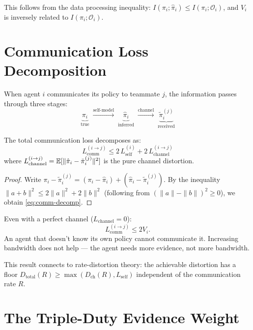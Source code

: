 This follows from the data processing inequality: $I(\pi_i; \hat{\pi}_i) \leq I(\pi_i; \mathcal{O}_i)$, and $V_i$ is inversely related to $I(\pi_i; \mathcal{O}_i)$.


\section{Communication Loss Decomposition}

When agent $i$ communicates its policy to teammate $j$, the information passes through three stages:
\[
    \underbrace{\pi_i}_{\text{true}} \;\xrightarrow{\text{self-model}}\;
    \underbrace{\hat{\pi}_i}_{\text{inferred}} \;\xrightarrow{\text{channel}}\;
    \underbrace{\tilde{\pi}_i^{(j)}}_{\text{received}}
\]

\begin{theorem}\label{thm:comm-decomp}
The total communication loss decomposes as:
\begin{equation}\label{eq:comm-decomp}
    L_{\text{comm}}^{(i \to j)} \leq 2\,L_{\text{self}}^{(i)} + 2\,L_{\text{channel}}^{(i \to j)}
\end{equation}
where $L_{\text{channel}}^{(i \to j)} = \mathbb{E}[\|\hat{\pi}_i - \tilde{\pi}_i^{(j)}\|^2]$ is the pure channel distortion.
\end{theorem}

\begin{proof}
Write $\pi_i - \tilde{\pi}_i^{(j)} = (\pi_i - \hat{\pi}_i) + (\hat{\pi}_i - \tilde{\pi}_i^{(j)})$. By the inequality $\|a+b\|^2 \leq 2\|a\|^2 + 2\|b\|^2$ (following from $(\|a\| - \|b\|)^2 \geq 0$), we obtain \eqref{eq:comm-decomp}.
\end{proof}

\begin{corollary}\label{cor:bottleneck}
Even with a perfect channel ($L_{\text{channel}} = 0$):
\begin{equation}
    L_{\text{comm}}^{(i \to j)} \leq 2 V_i.
\end{equation}
An agent that doesn't know its own policy cannot communicate it. Increasing bandwidth does not help --- the agent needs more evidence, not more bandwidth.
\end{corollary}

This result connects to rate-distortion theory: the achievable distortion has a floor $D_{\text{total}}(R) \geq \max(D_{\text{ch}}(R), L_{\text{self}})$ independent of the communication rate $R$.


\section{The Triple-Duty Evidence Weight}

